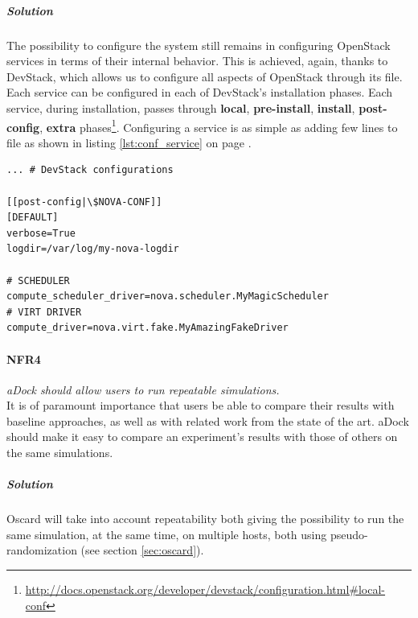 \subparagraph{Solution} The possibility to configure the system still remains in configuring OpenStack services in terms of their internal behavior. This is achieved, again, thanks to DevStack, which allows us to configure all aspects of OpenStack through its  file. Each service can be configured in each of DevStack's installation phases. Each service, during installation, passes through \textbf{local}, \textbf{pre-install}, \textbf{install}, \textbf{post-config}, \textbf{extra} phases\footnote{\url{http://docs.openstack.org/developer/devstack/configuration.html\#local-conf}}. Configuring a service is as simple as adding few lines to  file as shown in listing \ref{lst:conf_service} on page \pageref{lst:conf_service}.

\begin{lstlisting}[float,caption=Adding per-service configuration to DevStack's local.conf file,label={lst:conf_service}]
... # DevStack configurations

[[post-config|\$NOVA-CONF]]
[DEFAULT]
verbose=True
logdir=/var/log/my-nova-logdir

# SCHEDULER
compute_scheduler_driver=nova.scheduler.MyMagicScheduler
# VIRT DRIVER
compute_driver=nova.virt.fake.MyAmazingFakeDriver
\end{lstlisting}


\paragraph{NFR4}\label{p:nfr4} \emph{aDock should allow users to run repeatable simulations.} \hfill \\
It is of paramount importance that users be able to compare their results with baseline approaches, as well as with related work from the state of the art. aDock should make it easy to compare an experiment's results with those of others on the same simulations.

\subparagraph{Solution} Oscard will take into account repeatability both giving the possibility to run the same simulation, at the same time, on multiple hosts, both using pseudo-randomization (see section \ref{sec:oscard}).


